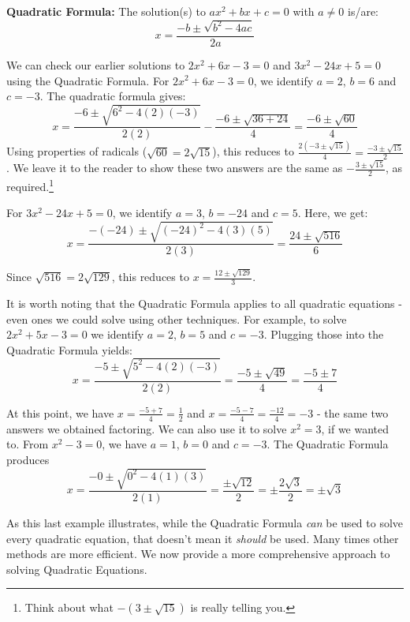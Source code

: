 \documentclass{ximera}
\begin{document}
\begin{theorem}\label{quadraticformula}  \textbf{Quadratic Formula:} The solution(s) to $ax^2 + bx + c = 0$ with $a \neq 0$ is/are: \[x  = \frac{-b \pm \sqrt{b^2 - 4ac}}{2a} \]

\end{theorem}


 

We can check our earlier solutions to $2x^2 + 6x - 3 = 0$ and $3x^2 - 24x + 5 = 0$ using the Quadratic Formula.  For $2x^2 + 6x - 3 = 0$, we identify $a = 2$, $b = 6$ and $c = -3$.  The quadratic formula gives: \[ x = \frac{-6 \pm \sqrt{6^2 - 4(2)(-3)}}{2(2)} - \frac{-6 \pm \sqrt{36 + 24}}{4} = \frac{-6 \pm \sqrt{60}}{4} \] Using properties of radicals ($\sqrt{60} = 2 \sqrt{15}$), this reduces to $\frac{2(-3 \pm \sqrt{15})}{4} =\frac{-3 \pm \sqrt{15}}{2}$. We leave it to the reader to show these two answers are the same as $-\frac{3 \pm \sqrt{15}}{2}$,  as required.\footnote{Think about what $-(3 \pm \sqrt{15})$ is really telling you.}  

\smallskip

For $3x^2 - 24x + 5 = 0$, we identify $a = 3$, $b = -24$ and $c = 5$.  Here, we get: \[ x = \frac{-(-24) \pm \sqrt{(-24)^2 - 4(3)(5)}}{2(3)} = \frac{24 \pm \sqrt{516}}{6} \]

Since $\sqrt{516} = 2\sqrt{129}$, this reduces to  $x = \frac{12 \pm \sqrt{129}}{3}$. 

\smallskip

It is worth noting that the Quadratic Formula applies to all quadratic equations - even ones we could solve using other techniques.  For example, to solve $2x^2 + 5x - 3 = 0$  we identify $a = 2$, $b = 5$ and $c = -3$.  Plugging those into the Quadratic Formula yields: \[ x = \frac{-5 \pm \sqrt{5^2 - 4(2)(-3)}}{2(2)} = \frac{-5 \pm \sqrt{49}}{4} = \frac{-5 \pm 7}{4} \]

At this point, we have $x = \frac{-5+7}{4} = \frac{1}{2}$ and $x = \frac{-5-7}{4} = \frac{-12}{4} = -3$ - the same two answers we obtained factoring.  We can also use it to solve $x^2 = 3$, if we wanted to.  From $x^2 -3 = 0$, we have $a = 1$, $b = 0$ and $c = -3$.  The Quadratic Formula produces \[ x = \frac{-0 \pm \sqrt{0^2 - 4(1)(3)}}{2(1)} = \frac{\pm\sqrt{12}}{2} = \pm \frac{2\sqrt{3}}{2} = \pm \sqrt{3}\]

As this last example illustrates, while the  Quadratic Formula \textit{can} be used to solve every quadratic equation, that doesn't mean it \textit{should} be used.  Many times other methods are more efficient.  We now provide a more comprehensive approach to solving Quadratic Equations.  
\end{document}

